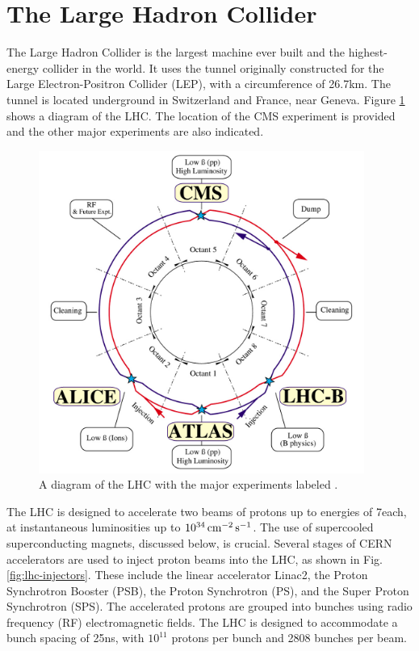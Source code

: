 \section{The Large Hadron Collider}

The Large Hadron Collider is the largest machine ever built and the highest-energy collider in the world. It uses the tunnel originally constructed for the Large Electron-Positron Collider (LEP), with a circumference of 26.7\unit{km}. The tunnel is located underground in Switzerland and France, near Geneva. Figure \ref{fig:lhc-diagram} shows a diagram of the LHC. The location of the CMS experiment is provided and the other major experiments are also indicated.

\begin{figure}[hbt]
\begin{center}
\includegraphics[width=0.95\textwidth]{figures/lhc-pho-1997-060.png}
\caption{A diagram of the LHC with the major experiments labeled \cite{Jean-Luc:841573}.}
\label{fig:lhc-diagram}
\end{center}
\end{figure}

The LHC is designed to accelerate two beams of protons up to energies of 7\TeV each, at instantaneous luminosities up to $10^{34}\,\text{cm}^\text{$-$2}\,\text{s}^\text{$-$1}$. The use of supercooled superconducting magnets, discussed below, is crucial. Several stages of CERN accelerators are used to inject proton beams into the LHC, as shown in Fig. \ref{fig:lhc-injectors}. These include the linear accelerator Linac2, the Proton Synchrotron Booster (PSB), the Proton Synchrotron (PS), and the Super Proton Synchrotron (SPS). The accelerated protons are grouped into bunches using radio frequency (RF) electromagnetic fields. The LHC is designed to accommodate a bunch spacing of 25\unit{ns}, with $10^{11}$ protons per bunch and 2808 bunches per beam.


